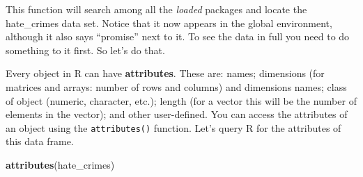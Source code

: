 \documentclass[]{book}
\newenvironment{Shaded}{\begin{snugshade}}{\end{snugshade}}
\newcommand{\KeywordTok}[1]{\textcolor[rgb]{0.13,0.29,0.53}{\textbf{#1}}}
\newcommand{\NormalTok}[1]{#1}
\theoremstyle{definition}
\theoremstyle{definition}
\theoremstyle{definition}
\theoremstyle{remark}
\begin{document}
This function will search among all the \emph{loaded} packages and
locate the hate\_crimes data set. Notice that it now appears in the
global environment, although it also says ``promise'' next to it. To see
the data in full you need to do something to it first. So let's do that.

Every object in R can have \textbf{attributes}. These are: names;
dimensions (for matrices and arrays: number of rows and columns) and
dimensions names; class of object (numeric, character, etc.); length
(for a vector this will be the number of elements in the vector); and
other user-defined. You can access the attributes of an object using the
\texttt{attributes()} function. Let's query R for the attributes of this
data frame.

\begin{Shaded}
\begin{Highlighting}[]
\KeywordTok{attributes}\NormalTok{(hate_crimes)}
\end{Highlighting}
\end{Shaded}
\end{document}
